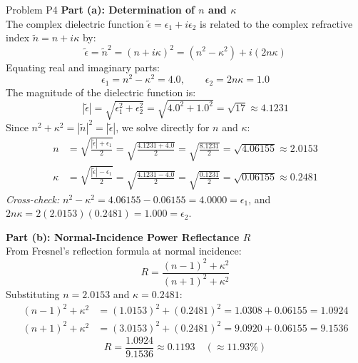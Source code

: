 \documentclass[11pt,a4paper]{article}
\begin{document}
\begin{solbox}{Problem P4}
\textbf{Part (a): Determination of $n$ and $\kappa$} \\
The complex dielectric function $\tilde\epsilon = \epsilon_1 + i\epsilon_2$ is related to the complex refractive index $\tilde n = n + i\kappa$ by:
\begin{equation}
    \tilde\epsilon = \tilde n^2 = (n + i\kappa)^2 = (n^2 - \kappa^2) + i(2n\kappa)
\end{equation}
Equating real and imaginary parts:
\begin{equation}
    \epsilon_1 = n^2 - \kappa^2 = 4.0, \qquad \epsilon_2 = 2n\kappa = 1.0
\end{equation}
The magnitude of the dielectric function is:
\begin{equation}
    |\tilde\epsilon| = \sqrt{\epsilon_1^2 + \epsilon_2^2} = \sqrt{4.0^2 + 1.0^2} = \sqrt{17} \approx 4.1231
\end{equation}
Since $n^2 + \kappa^2 = |\tilde n|^2 = |\tilde\epsilon|$, we solve directly for $n$ and $\kappa$:
\begin{align}
    n &= \sqrt{\frac{|\tilde\epsilon| + \epsilon_1}{2}} = \sqrt{\frac{4.1231 + 4.0}{2}} = \sqrt{\frac{8.1231}{2}} = \sqrt{4.06155} \approx \mathbf{2.0153} \\
    \kappa &= \sqrt{\frac{|\tilde\epsilon| - \epsilon_1}{2}} = \sqrt{\frac{4.1231 - 4.0}{2}} = \sqrt{\frac{0.1231}{2}} = \sqrt{0.06155} \approx \mathbf{0.2481}
\end{align}
\textit{Cross-check:} $n^2 - \kappa^2 = 4.06155 - 0.06155 = 4.0000 = \epsilon_1$, and $2n\kappa = 2(2.0153)(0.2481) = 1.000 = \epsilon_2$.

\textbf{Part (b): Normal-Incidence Power Reflectance $R$} \\
From Fresnel's reflection formula at normal incidence:
\begin{equation}
    R = \frac{(n - 1)^2 + \kappa^2}{(n + 1)^2 + \kappa^2}
\end{equation}
Substituting $n = 2.0153$ and $\kappa = 0.2481$:
\begin{align}
    (n - 1)^2 + \kappa^2 &= (1.0153)^2 + (0.2481)^2 = 1.0308 + 0.06155 = 1.0924 \\
    (n + 1)^2 + \kappa^2 &= (3.0153)^2 + (0.2481)^2 = 9.0920 + 0.06155 = 9.1536
\end{align}
\begin{equation}
    R = \frac{1.0924}{9.1536} \approx \mathbf{0.1193} \quad (\approx \mathbf{11.93\%})
\end{equation}
\end{solbox}
\end{document}
